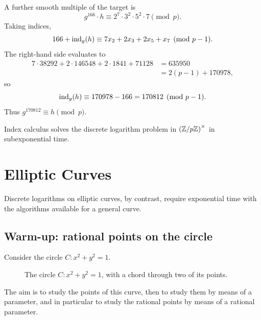 \begin{example}
A further smooth multiple of the target is
\[
    g^{166}\cdot h\equiv 2^{7}\cdot 3^{2}\cdot 5^{2}\cdot 7\pmod{p}.
\]
Taking indices,
\[
    166+\operatorname{ind}_{g}(h)
    \equiv 7x_{2}+2x_{3}+2x_{5}+x_{7}
    \pmod{p-1}.
\]
The right-hand side evaluates to
\begin{align*}
    7\cdot 38292+2\cdot 146548+2\cdot 1841+71128
    &=635950\\
    &=2(p-1)+170978,
\end{align*}
so
\[
    \operatorname{ind}_{g}(h)
    \equiv 170978-166
    =170812\pmod{p-1}.
\]
Thus \(g^{170812}\equiv h\pmod{p}\).
\end{example}

Index calculus solves the discrete logarithm problem in \(\left(\mathbb Z/p\mathbb Z\right)^\times\) in
subexponential time.

\section{Elliptic Curves}
\label{sec:ec-warmup}

Discrete logarithms on elliptic curves, by contrast,
require exponential time with the algorithms available for a general curve.

\subsection{Warm-up: rational points on the circle}

Consider the circle \(C\colon x^{2}+y^{2}=1\).

\begin{figure}[H]
\centering
{}
\caption{The circle \(C\colon x^{2}+y^{2}=1\), with a chord through two of
its points.}
\end{figure}

The aim is to study the points of this curve, then to study them by means
of a parameter, and in particular to study the rational points by means of
a rational parameter.

